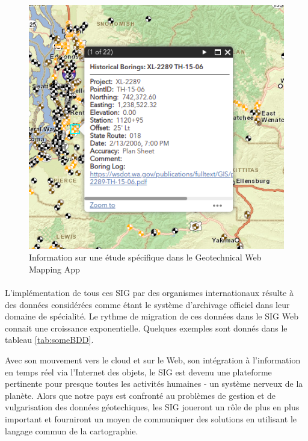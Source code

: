 \begin{figure}[t]
    \centering
    \includegraphics[width=1\textwidth]{images/Contexte/wash.png}
    \caption{Information sur une étude spécifique dans le Geotechnical Web Mapping App}
    \label{fig:wash}
\end{figure}

\paragraph{}
L’implémentation de tous ces SIG par des organismes internationaux résulte à des données considérées 
comme étant le système d’archivage officiel dans leur domaine de spécialité.
Le rythme de migration de ces données dans le SIG Web connait une croissance exponentielle. 
Quelques exemples sont donnés dans le tableau \ref{tab:someBDD}.
\par
Avec son mouvement vers le cloud et sur le Web, son intégration à l'information 
en temps réel via l'Internet des objets, le SIG est devenu une plateforme 
pertinente pour presque toutes les activités humaines - un système nerveux de 
la planète. Alors que notre pays est confronté au problèmes de gestion et de vulgarisation 
des données géotechiques, les SIG joueront un rôle de plus 
en plus important et 
fourniront un moyen de communiquer des solutions en utilisant le langage commun de 
la cartographie.


